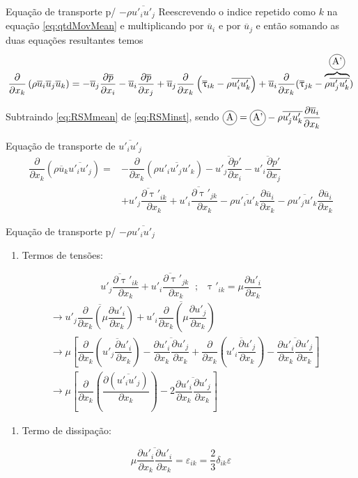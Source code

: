 \documentclass[10pt]{beamer}
\newcommand{\ddx}[2]{\dfrac{\partial #1}{\partial x_{#2}}}
\newcommand{\ddxp}[2]{\dfrac{\partial }{\partial x_{#2}}\left(#1\right)}
\newcommand{\m}[1]{\overline{#1}}
\newcommand{\incircle}[1]{{\tikz[baseline=(X.base)] \node(X)[draw, shape=circle, inner sep=0]{\strut #1};}}
\begin{document}
\begin{frame}{Equação de transporte p/ $ -\rho \m{u'_i u'_j} $}
	Reescrevendo o indice repetido como $k$ na equação \ref{eq:qtdMovMean} e multiplicando por $ \m{u}_i $ e por $ \m{u}_j $ e então somando as duas equações resultantes temos
	\begin{equation}\label{eq:RSMmean}
	\ddxp{\rho \m{u}_i \m{u}_j \m{u}_k}{k} = - \m{u}_j \ddx{\m{p}}{i} - \m{u}_i \ddx{\m{p}}{j} + \m{u}_j \ddxp{\m{\uptau}_{ik} - \rho\m{u'_iu'_k}}{k} + \m{u}_i \ddx{}{k}(\m{\uptau}_{jk} - \overbrace{\rho\m{u'_ju'_k}}^{\incircle{A'}})
	\end{equation}
	
	Subtraindo \ref{eq:RSMmean} de \ref{eq:RSMinst}, sendo $\incircle{A} = \incircle{A'} - \rho \m{u'_ju'_k}\ddx{\m{u}_i}{k}$
	
	\begin{block}{Equação de transporte de $ \m{u'_i u'_j} $}
		\begin{align}\label{eq:uiuj}
	\ddxp{\rho \m{u}_k \m{u'_i u'_j}}{k} = &- \ddxp{\rho \m{u'_iu'_ju'_k}}{k} - \m{u'_j\ddx{p'}{i}} - \m{u'_i\ddx{p'}{j}} \nonumber \\
	&+ \m{u'_j\ddx{\uptau'_{ik}}{k}} + \m{u'_i\ddx{\uptau'_{jk}}{k}}
	- \rho \m{u'_i u'_k} \ddx{\m{u}_i}{k} - \rho \m{u'_j u'_k} \ddx{\m{u}_i}{k} 
	\end{align}
	\end{block}
		
\end{frame}

\begin{frame}{Equação de transporte p/ $ -\rho \m{u'_i u'_j} $}
	
	\begin{enumerate}[$\bullet$]
		\item Termos de tensões:
	\end{enumerate}
	
	\begin{equation*}
	\m{u'_j\ddx{\uptau'_{ik}}{k}} + \m{u'_i\ddx{\uptau'_{jk}}{k}} \;\;;\;\; \uptau'_{ik} = \mu \ddx{u'_i}{k}
	\end{equation*}
	\begin{align*}
	&\rightarrow \m{u'_j\ddxp{\mu \ddx{u'_i}{k}}{k}} + \m{u'_i\ddxp{\mu \ddx{u'_j}{k}}{k}} \\
	&\rightarrow \mu \left[ \ddxp{\m{u'_j \ddx{u'_i}{k}}}{k} - \m{\ddx{u'_i}{k}\ddx{u'_j}{k}} + \ddxp{\m{u'_i \ddx{u'_j}{k}}}{k} - \m{\ddx{u'_i}{k}\ddx{u'_j}{k}} \right] \\
	&\rightarrow \mu \left[ \ddxp{\ddx{(\m{u'_iu'_j})}{k}}{k} - 2 \m{\ddx{u'_i}{k}\ddx{u'_j}{k}} \right]
	\end{align*}
	
	\begin{enumerate}[$\bullet$]
		\item Termo de dissipação:
	\end{enumerate}
	\begin{equation*}
	\mu \m{\ddx{u'_i}{k}\ddx{u'_i}{k}} = \varepsilon_{ik} = \dfrac{2}{3} \delta_{ik}\varepsilon
	\end{equation*}
	
	
\end{frame}
\end{document}
